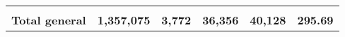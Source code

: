 \begin{tabular}{lrcclr}
	& \multicolumn{1}{l}{}                                           & \multicolumn{1}{l}{}                                       & \multicolumn{1}{l}{} &                                                                     & \multicolumn{1}{l}{}                                                         \\
	\rowcolor[HTML]{DDEBF7} 
	\textbf{Total   general}                                       & \textbf{1,357,075}                                             & \multicolumn{1}{r}{\cellcolor[HTML]{DDEBF7}\textbf{3,772}} & \textbf{36,356}      & \textbf{40,128}                                                     & \textbf{295.69}                                                             
\end{tabular}
